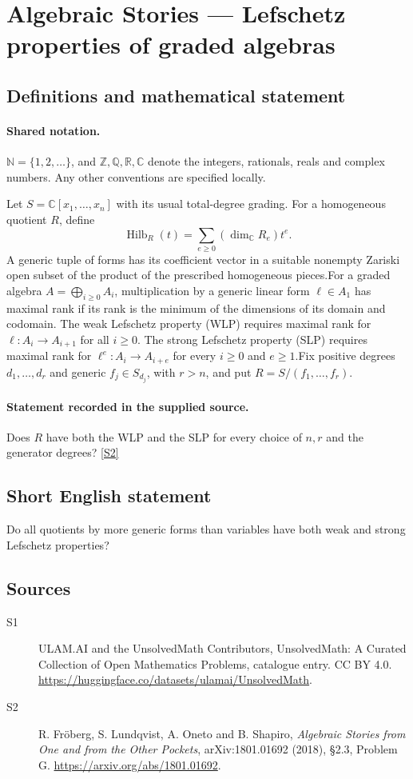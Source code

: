 \documentclass[11pt]{article}
\newcommand{\sref}[2]{\hyperlink{source:#1:#2}{[S#2]}}
\begin{document}
\section{Algebraic Stories — Lefschetz properties of graded algebras}\label{statement}

\subsection{Definitions and mathematical statement}

\paragraph{Shared notation.}$\mathbb N=\{1,2,\ldots\}$, and $\mathbb Z,\mathbb Q,\mathbb R,\mathbb C$ denote the integers, rationals, reals and complex numbers. Any other conventions are specified locally.


Let $S=\mathbb C[x_1,\ldots,x_n]$ with its usual total-degree grading. For a homogeneous quotient $R$, define
\[\operatorname{Hilb}_R(t)=\sum_{e\geq0}(\dim_{\mathbb C}R_e)t^e.
\]
A generic tuple of forms has its coefficient vector in a suitable nonempty Zariski open subset of the product of the prescribed homogeneous pieces.For a graded algebra $A=\bigoplus_{i\geq0}A_i$, multiplication by a generic linear form $\ell\in A_1$ has maximal rank if its rank is the minimum of the dimensions of its domain and codomain. The weak Lefschetz property (WLP) requires maximal rank for $\ell:A_i\to A_{i+1}$ for all $i\geq0$. The strong Lefschetz property (SLP) requires maximal rank for $\ell^e:A_i\to A_{i+e}$ for every $i\geq0$ and $e\geq1$.Fix positive degrees $d_1,\ldots,d_r$ and generic $f_j\in S_{d_j}$, with $r>n$, and put $R=S/(f_1,\ldots,f_r)$.
\paragraph{Statement recorded in the supplied source.}
Does $R$ have both the WLP and the SLP for every choice of $n,r$ and the generator degrees? \sref{statement}{2}
\subsection{Short English statement}
Do all quotients by more generic forms than variables have both weak and strong Lefschetz properties?
\subsection{Sources}
\begin{description}
\item[\hypertarget{source:statement:1}{S1}] ULAM.AI and the UnsolvedMath Contributors, UnsolvedMath: A Curated Collection of Open Mathematics Problems, catalogue entry. CC BY 4.0. \url{https://huggingface.co/datasets/ulamai/UnsolvedMath}.
\item[\hypertarget{source:statement:2}{S2}] R. Fröberg, S. Lundqvist, A. Oneto and B. Shapiro, \emph{Algebraic Stories from One and from the Other Pockets}, arXiv:1801.01692 (2018), §2.3, Problem G. \url{https://arxiv.org/abs/1801.01692}.
\end{description}
\label{end:statement}
\end{document}

